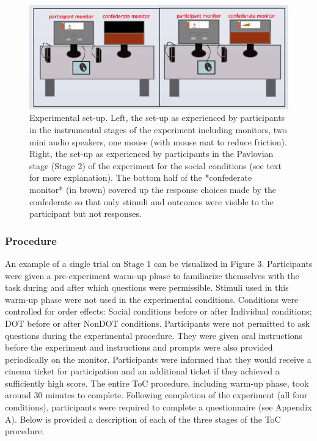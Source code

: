\documentclass[]{elsarticle} %
\begin{document}
\begin{figure}

{\centering \includegraphics[width=1\linewidth]{figure2} 

}

\caption{Experimental set-up. Left, the set-up as experienced by participants in the instrumental stages of the experiment including monitors, two mini audio speakers, one mouse (with mouse mat to reduce friction). Right, the set-up as experienced by participants in the Pavlovian stage (Stage 2) of the experiment for the social conditions (see text for more explanation). The bottom half of the *confederate monitor* (in brown) covered up the response choices made by the confederate so that only stimuli and outcomes were visible to the participant but not responses.}\label{fig:figure2}
\end{figure}

\hypertarget{procedure}{%
\subsubsection{Procedure}\label{procedure}}

An example of a single trial on Stage 1 can be visualized in Figure 3.
Participants were given a pre-experiment warm-up phase to familiarize
themselves with the task during and after which questions were
permissible. Stimuli used in this warm-up phase were not used in the
experimental conditions. Conditions were controlled for order effects:
Social conditions before or after Individual conditions; DOT before or
after NonDOT conditions. Participants were not permitted to ask
questions during the experimental procedure. They were given oral
instructions before the experiment and instructions and prompts were
also provided periodically on the monitor. Participants were informed
that they would receive a cinema ticket for participation and an
additional ticket if they achieved a sufficiently high score. The entire
ToC procedure, including warm-up phase, took around 30 minutes to
complete. Following completion of the experiment (all four conditions),
participants were required to complete a questionnaire (see Appendix A).
Below is provided a description of each of the three stages of the ToC
procedure.
\end{document}
